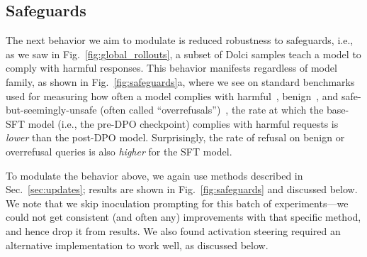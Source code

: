 \documentclass{article} %
\begin{document}
\subsection{Safeguards}
\label{sec:safeguards}

The next behavior we aim to modulate is reduced robustness to safeguards, i.e., as we saw in Fig.~\ref{fig:global_rollouts}, a subset of Dolci samples teach a model to comply with harmful responses.
% 
This behavior manifests regardless of model family, as shown in Fig.~\ref{fig:safeguards}a, where we see on standard benchmarks used for measuring how often a model complies with harmful~\citep{mazeika2024harmbench,wildteaming2024}, benign~\citep{wildteaming2024}, and safe-but-seemingly-unsafe (often called ``overrefusals'')~\citep{rottger2024xstest}, the rate at which the base-SFT model (i.e., the pre-DPO checkpoint) complies with harmful requests is \textit{lower} than the post-DPO model.
% 
Surprisingly, the rate of refusal on benign or overrefusal queries is also \textit{higher} for the SFT model.

To modulate the behavior above, we again use methods described in Sec.~\ref{sec:updates}; results are shown in Fig.~\ref{fig:safeguards} and discussed below. 
% 
We note that we skip inoculation prompting for this batch of experiments---we could not get consistent (and often any) improvements with that specific method, and hence drop it from results.
% 
We also found activation steering required an alternative implementation to work well, as discussed below.
\end{document}
